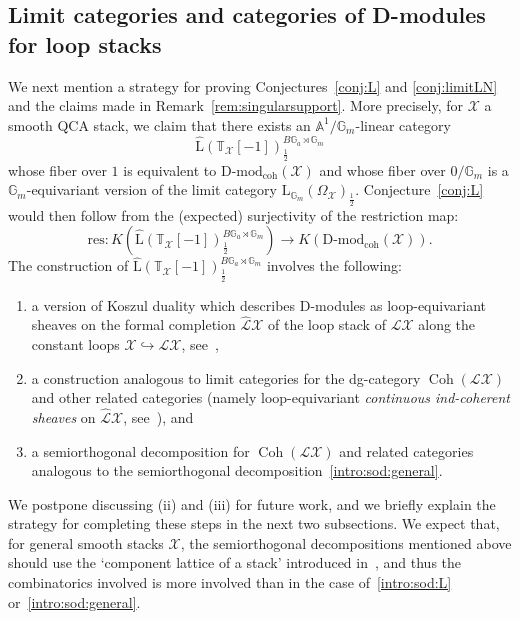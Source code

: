 \documentclass [11pt,oneside,a4paper,mathscr]{amsart}
\theoremstyle{definition}
\newcommand{\X}{\mathcal{X}}
\newcommand{\Coh}{\operatorname{Coh}}
\begin{document}
\subsection{Limit categories and categories of D-modules for loop stacks}\label{subsection:DLL}
We next mention a strategy for proving Conjectures~\ref{conj:L} and \ref{conj:limitLN} and the claims made in Remark~\ref{rem:singularsupport}. 
More precisely, for $\X$ a smooth QCA stack, 
we claim that there exists an $\mathbb{A}^1/\mathbb{G}_m$-linear category \[\hat{\text{L}}(\mathbb{T}_\X[-1])^{B\mathbb{G}_a\rtimes\mathbb{G}_m}_{\frac{1}{2}}\] whose fiber over $1$ is equivalent to $\text{D-mod}_{\mathrm{coh}}(\X)$ and whose fiber over $0/\mathbb{G}_m$ is a $\mathbb{G}_m$-equivariant version of the limit category $\text{L}_{\mathbb{G}_m}(\Omega_\X)_{\frac{1}{2}}$. 
Conjecture~\ref{conj:L} would then follow from the (expected) surjectivity of the restriction map:
\[\text{res}\colon K(\hat{\text{L}}(\mathbb{T}_\X[-1])^{B\mathbb{G}_a\rtimes\mathbb{G}_m}_{\frac{1}{2}})\to K(\text{D-mod}_{\mathrm{coh}}(\X)).\]
The construction of $\hat{\text{L}}(\mathbb{T}_\X[-1])^{B\mathbb{G}_a\rtimes\mathbb{G}_m}_{\frac{1}{2}}$ involves the following:
\begin{enumerate}
    \item a version of Koszul duality which describes D-modules as loop-equivariant sheaves on the formal completion $\hat{\mathscr{L}}\X$ of the loop stack of $\mathscr{L}\X$ along the constant loops $\X\hookrightarrow \mathscr{L}\X$, see~\cite{BZNa, HChen},
    \item a construction analogous to limit categories for the dg-category $\Coh(\mathscr{L}\X)$ and other related categories (namely loop-equivariant \textit{continuous ind-coherent sheaves} on $\hat{\mathscr{L}}\X$, see~\cite{HChen, ChenDhillon}), and 
    \item a semiorthogonal decomposition for $\Coh(\mathscr{L}\X)$ and related categories analogous to the semiorthogonal decomposition~\eqref{intro:sod:general}.
\end{enumerate}
We postpone discussing (ii) and (iii) for future work, and we briefly explain the strategy for completing these steps in the next two subsections. 
 We expect that, for general smooth stacks $\X$, the semiorthogonal decompositions mentioned above should use the `component lattice of a stack' introduced in~\cite{BHLINK}, and thus the combinatorics involved is more involved than in the case of~\eqref{intro:sod:L} or~\eqref{intro:sod:general}. 
\end{document}

